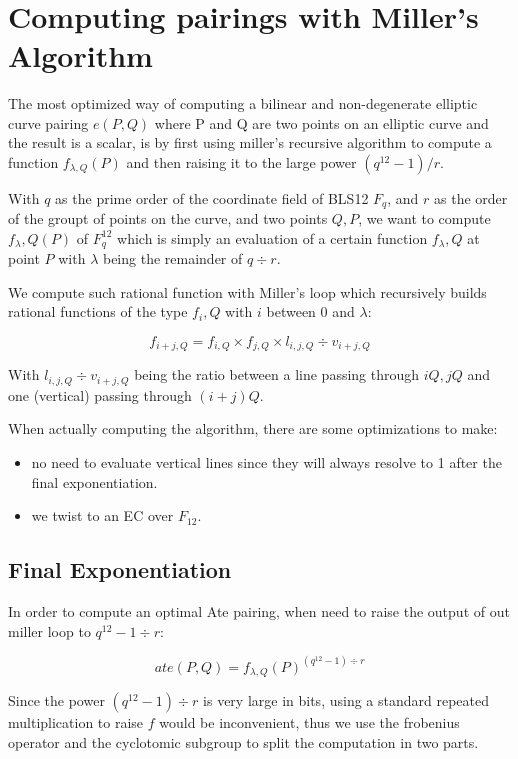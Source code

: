 \documentclass{article}
\begin{document}
\

\section{Computing pairings with Miller's Algorithm}
The most optimized way of computing a bilinear and non-degenerate elliptic curve pairing \( e (P, Q) \) where P and Q are two points on an elliptic curve and the result is a scalar, is by first using miller's recursive algorithm to compute a function \( f_{\lambda, Q}(P)\) and then raising it to the large power \( (q^{12} - 1) / r \).

With \( q \) as the prime order of the coordinate field of BLS12 \( F_q \), and \( r \) as the order of the groupt of points on the curve, and two points \( Q, P \), we want to compute \( f_\lambda, Q (P) \) of \( F_q^{12} \) which is simply an evaluation of a certain function \( f_\lambda, Q \) at point \( P \) with \( \lambda \) being the remainder of \( q \div r \).

We compute such rational function with Miller's loop which recursively builds rational functions of the type \( f_i, Q \) with \( i \) between \( 0 \) and \( \lambda \):

\[ f_{ i + j, Q} = f_{ i, Q } \times f_{ j, Q } \times l_{i, j, Q} \div v_{i + j, Q} \]

With \( l_{i, j, Q} \div v_{i + j, Q} \) being the ratio between a line passing through \( iQ, jQ \) and one (vertical) passing through \( (i + j) Q \).

When actually computing the algorithm, there are some optimizations to make:

\begin{itemize}
\item no need to evaluate vertical lines since they will always resolve to 1 after the final exponentiation.
\item we twist to an EC over \( F_{12} \).
\end{itemize}

\subsection{Final Exponentiation}
In order to compute an optimal Ate pairing, when need to raise the output of out miller loop to \( q^{12} - 1 \div r \):

\[ ate (P, Q) = f_{\lambda, Q} (P) ^{(q^{12} - 1) \div r} \]

Since the power \( (q^{12} - 1) \div r \) is very large in bits, using a standard repeated multiplication to raise \( f \) would be inconvenient, thus we use the frobenius operator and the cyclotomic subgroup to split the computation in two parts.
\end{document}
